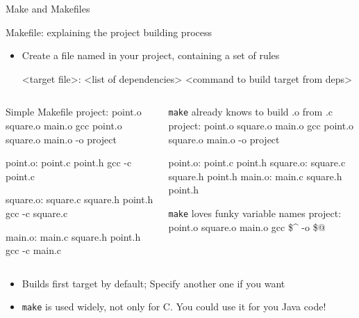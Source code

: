 \begin{frame}[fragile]{Make and Makefiles}
  \begin{block}{Makefile: explaining the project building process}    
    \begin{itemize}
    \item Create a file named  in your project,
      containing a set of rules
        {  \footnotesize
        \begin{semiverbatim}
<target file>: <list of dependencies>
    <command to build target from deps>
        \end{semiverbatim}}\vspace{-.7\baselineskip}
    \end{itemize}
  \begin{columns}
    \begin{column}{.45\linewidth}\medskip
  \begin{boitecode}{Simple Makefile}
project: point.o square.o main.o
    gcc point.o square.o main.o -o project

point.o: point.c point.h
    gcc -c point.c

square.o: square.c square.h point.h
    gcc -c square.c

main.o: main.c square.h point.h
    gcc -c main.c
  \end{boitecode}      
    \end{column}
    \begin{column}{.48\linewidth}
      \begin{boitecode}{\texttt{make} already knows to build .o from .c}
project: point.o square.o main.o
    gcc point.o square.o main.o -o project

point.o: point.c point.h
square.o: square.c square.h point.h
main.o: main.c square.h point.h
      \end{boitecode}

      \vspace{-.7\baselineskip}
      \begin{boitecode}{\texttt{make} loves funky variable names}
project: point.o square.o main.o
    gcc \$^ -o \$@
      \end{boitecode}
    \end{column}
  \end{columns}
  \end{block}
  \begin{itemize}\vspace{-.2\baselineskip}
  \item Builds first target by default; Specify another one if you want
  \item\texttt{make} is used widely, not only for C. You could use it for you Java code!
  \end{itemize}
\end{frame}

